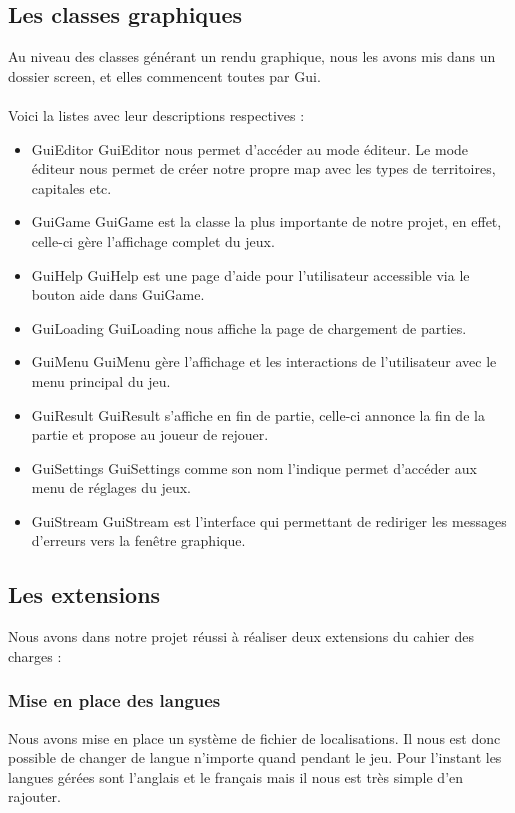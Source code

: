   \subsection{Les classes graphiques}
Au niveau des classes générant un rendu graphique, nous les avons mis dans un dossier screen, et elles commencent toutes par Gui.
\\
\\
  Voici la listes avec leur descriptions respectives :
  \\
  \begin{itemize}
    \item GuiEditor
      GuiEditor nous permet d'accéder au mode éditeur. Le mode éditeur nous permet de créer notre propre map avec les types de territoires, capitales etc.\\
    \item GuiGame
      GuiGame est la classe la plus importante de notre projet, en effet, celle-ci gère l'affichage complet du jeux.\\
    \item GuiHelp
      GuiHelp est une page d'aide pour l'utilisateur accessible via le bouton aide dans GuiGame.\\
    \item GuiLoading
      GuiLoading nous affiche la page de chargement de parties.
    \item GuiMenu
      GuiMenu gère l'affichage et les interactions de l'utilisateur avec le menu principal du jeu.\\
    \item GuiResult
      GuiResult s'affiche en fin de partie, celle-ci annonce la fin de la partie et propose au joueur de rejouer.\\
    \item GuiSettings
      GuiSettings comme son nom l'indique permet d'accéder aux menu de réglages du jeux.\\
    \item GuiStream
     GuiStream est l'interface qui permettant de rediriger les messages d'erreurs vers la  fenêtre graphique.\\
  \end{itemize}
  
  \subsection{Les extensions}
    Nous avons dans notre projet réussi à réaliser deux extensions du cahier des charges :
    \subsubsection{Mise en place des langues}
      Nous avons mise en place un système de fichier de localisations. Il nous est donc possible de changer de langue n'importe quand pendant le jeu. Pour l'instant les langues gérées sont
      l'anglais et le français mais il nous est très simple d'en rajouter.
      
